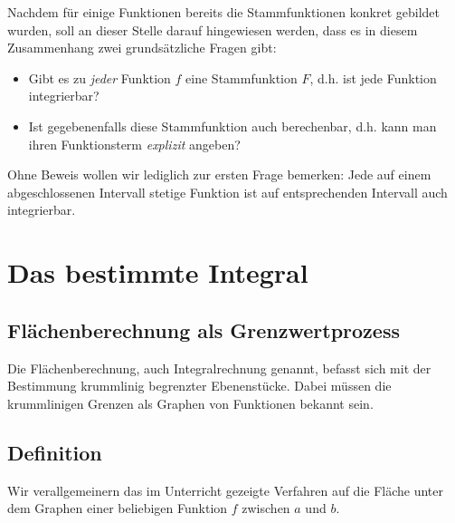 \documentclass[%
11pt,%
twoside,%
titlepage,%
german,%
headsepline%
]{scrartcl}
\begin{document}
Nachdem für einige Funktionen bereits die Stammfunktionen konkret gebildet wurden, soll an dieser Stelle darauf hingewiesen werden, dass es in diesem Zusammenhang zwei grundsätzliche Fragen gibt:

\begin{itemize}
\item Gibt es zu \emph{jeder} Funktion $f$ eine Stammfunktion $F$, d.h. ist jede Funktion integrierbar?
\item Ist gegebenenfalls diese Stammfunktion auch berechenbar, d.h. kann man ihren Funk\-tions\-term \emph{explizit} angeben?
\end{itemize}

Ohne Beweis wollen wir lediglich zur ersten Frage bemerken: Jede auf einem abgeschlossenen Intervall stetige Funktion ist auf entsprechenden Intervall auch integrierbar.

\clearpage

\section{Das bestimmte Integral}
\subsection{Flächenberechnung als Grenzwertprozess}
Die
Flächenberechnung, auch Integralrechnung genannt, befasst sich mit der Bestimmung krummlinig begrenzter Ebenenstücke. Dabei müssen die krummlinigen Grenzen als Graphen von Funktionen bekannt sein.


\subsection{Definition}
Wir verallgemeinern das im Unterricht gezeigte Verfahren auf die Fläche unter dem Graphen einer beliebigen Funktion $f$ zwischen $a$ und $b$.
\end{document}

